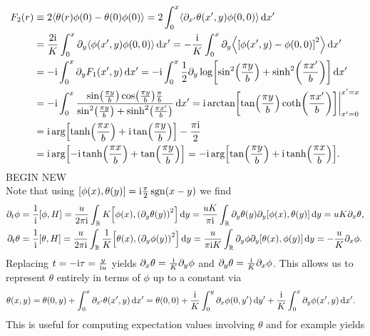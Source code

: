 \documentclass[english, parskip=full]{scrartcl}
\begin{document}
\begin{align}
F_2(r) &\equiv 2\bra*{\theta(r) \phi(0) - \theta(0)\phi(0)} = 2\intx{0}{x}{\bra*{\partial_{x'} \theta(x',y)\phi(0,0)}}{x'}\\
&= \frac{2\i}{K} \intx{0}{x}{\partial_y \bra*{\phi(x',y)\phi(0,0)}}{x'} = -\frac{\i}{K} \intx{0}{x}{\partial_y \bra*{\klb*{\phi(x',y) - \phi(0,0)}^2}}{x'}\\
&= -\i \intx{0}{x}{\partial_y F_1(x',y)}{x'} = -\i \intx{0}{x}{ \frac{1}{2}\partial_y \log\klb*{\sin^2\kla*{\frac{\pi y}{b}} + \sinh^2\kla*{\frac{\pi x'}{b}}} }{x'}\\
&= -\i \intx{0}{x}{\frac{\sin\kla*{\frac{\pi y}{b}} \cos\kla*{\frac{\pi y}{b}} \frac{\pi}{b}}{\sin^2\kla*{\frac{\pi y}{b}} + \sinh^2\kla*{\frac{\pi x'}{b}}}}{x'} = \i \arctan\klb*{\tan\kla*{\frac{\pi y}{b}} \coth\kla*{\frac{\pi x'}{b}}}\bigg\vert_{x'=0}^{x'=x}\\
&= \i \arg\klb*{\tanh\kla*{\frac{\pi x}{b}} + \i \tan\kla*{\frac{\pi y}{b}}} - \frac{\pi \i}{2}\\
&= \i \arg\klb*{-\i \tanh\kla*{\frac{\pi x}{b}} + \tan\kla*{\frac{\pi y}{b}}} = -\i \arg\klb*{\tan\kla*{\frac{\pi y}{b}} + \i \tanh\kla*{\frac{\pi x}{b}}}.
\end{align}
BEGIN NEW\\
Note that using $\klb*{\phi(x), \theta(y)} = \i \frac{\pi}{2} \sgn(x-y)$ we find
\begin{align}
\partial_t \phi &= \frac{1}{\i} \klb*{\phi, H} = \frac{u}{2\pi\i} \intr{K \klb*{\phi(x), \kla*{\partial_y\theta(y)}^2}}{y} = \frac{uK}{\pi\i} \intr{\partial_y\theta(y) \partial_y \klb*{\phi(x), \theta(y)}}{y} = uK\partial_x\theta,\\
\partial_t\theta &= \frac{1}{\i} \klb*{\theta, H} = \frac{u}{2\pi\i} \intr{\frac{1}{K} \klb*{\theta(x), \kla*{\partial_y\phi(y)}^2}}{y} = \frac{u}{\pi\i K} \intr{\partial_y\phi \partial_y\klb*{\theta(x), \phi(y)}}{y} = -\frac{u}{K} \partial_x\phi.
\end{align}
Replacing $t=-\i \tau = \frac{y}{\i u}$ yields $\partial_x\theta = \frac{\i}{K} \partial_y\phi$ and $\partial_y\theta = \frac{\i}{K} \partial_x\phi$.
This allows us to represent $\theta$ entirely in terms of $\phi$ up to a constant via
\begin{align}
\theta(x,y) &= \theta(0,y) + \intx{0}{x}{\partial_{x'} \theta(x',y)}{x'} = \theta(0,0) + \frac{\i}{K} \intx{0}{y}{\partial_{x} \phi(0,y')}{y'} + \frac{\i}{K} \intx{0}{x}{\partial_y\phi(x',y)}{x'}.
\end{align}
This is useful for computing expectation values involving $\theta$ and for example yields
\end{document}
